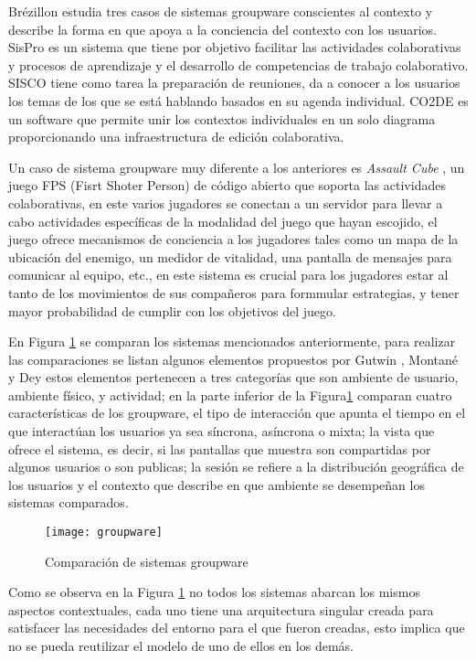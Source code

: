 Br\'ezillon \citep{brezillon2004context} estudia tres casos de sistemas groupware conscientes al contexto y describe la forma en que apoya a la conciencia del contexto con los usuarios. SisPro es un sistema que tiene por objetivo facilitar las actividades colaborativas y procesos de aprendizaje y el desarrollo de competencias de trabajo colaborativo. SISCO tiene como tarea la preparaci\'on de reuniones,  da a conocer a los usuarios los temas de los que se est\'a hablando basados en su agenda individual. CO2DE es un software que permite unir los contextos individuales en un solo diagrama proporcionando una infraestructura de edici\'on colaborativa. 

Un caso de sistema groupware muy diferente a los anteriores es \textit{Assault Cube} \citep{montane2013context}, un juego FPS (Fisrt Shoter Person) de c\'odigo abierto que soporta las actividades colaborativas, en este varios jugadores se conectan a un servidor para llevar a cabo actividades espec\'ificas de la modalidad del juego que hayan escojido, el juego ofrece mecanismos de conciencia a los jugadores tales como un mapa de la ubicaci\'on del enemigo, un medidor de vitalidad, una pantalla de mensajes para comunicar al equipo, etc., en este sistema es crucial para los jugadores estar al tanto de los movimientos de sus compa\~neros para formmular estrategias, y tener mayor probabilidad de cumplir con los objetivos del juego.

En Figura \ref{gw:comp} se comparan los sistemas mencionados anteriormente, para realizar las comparaciones se listan algunos elementos propuestos por Gutwin \citep{gutwin1996supporting}, Montan\'e \citep{montane2013context} y Dey \citep{dey2001conceptual} estos elementos pertenecen a tres categor\'ias que son ambiente de usuario, ambiente f\'isico, y actividad; en la parte inferior de la Figura\ref{gw:comp} comparan cuatro caracter\'isticas de los groupware, el tipo de interacci\'on que apunta el tiempo en el que interact\'uan los usuarios ya sea s\'incrona, as\'incrona o mixta; la vista que ofrece el sistema, es decir, si las pantallas que muestra son compartidas por algunos usuarios o son publicas; la sesi\'on se refiere a la distribuci\'on geogr\'afica de los usuarios y el contexto que describe en que ambiente se desempe\~nan los sistemas comparados.

\begin{figure}[h!]
  \centering
    \texttt{[image: groupware]}
  \caption{Comparaci\'on de sistemas groupware}
  \label{gw:comp}
\end{figure}

Como se observa en la Figura \ref{gw:comp} no todos los sistemas abarcan los mismos aspectos contextuales, cada uno tiene una arquitectura singular creada para satisfacer las necesidades del entorno para el que fueron creadas, esto implica que no se pueda reutilizar el modelo de uno de ellos en los dem\'as.